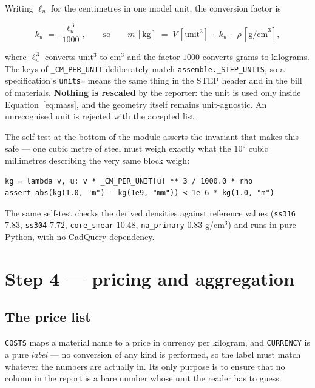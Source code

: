 \documentclass[9pt,a4paper]{extarticle}
\newcommand{\code}[1]{\texttt{\small #1}}
\begin{document}
Writing $\ell_u$ for the centimetres in one model unit, the conversion factor is

\begin{equation}
  k_u \;=\; \frac{\ell_u^{\,3}}{1000},
  \qquad\text{so}\qquad
  m\,[\text{kg}] \;=\; V\,[\text{unit}^3]\;\cdot\;k_u\;\cdot\;\rho\,[\text{g/cm}^3],
  \label{eq:mass}
\end{equation}

where $\ell_u^{\,3}$ converts unit$^3$ to cm$^3$ and the factor $1000$ converts
grams to kilograms. The keys of \code{\_CM\_PER\_UNIT} deliberately match
\code{assemble.\_STEP\_UNITS}, so a specification's \code{units=} means the same
thing in the STEP header and in the bill of materials. \textbf{Nothing is
rescaled} by the reporter: the unit is used only inside
Equation~\eqref{eq:mass}, and the geometry itself remains unit-agnostic. An
unrecognised unit is rejected with the accepted list.

The self-test at the bottom of the module asserts the invariant that makes this
safe --- one cubic metre of steel must weigh exactly what the $10^9$ cubic
millimetres describing the very same block weigh:

\begin{lstlisting}[style=py]
kg = lambda v, u: v * _CM_PER_UNIT[u] ** 3 / 1000.0 * rho
assert abs(kg(1.0, "m") - kg(1e9, "mm")) < 1e-6 * kg(1.0, "m")
\end{lstlisting}

The same self-test checks the derived densities against reference values
(\code{ss316} $7.83$, \code{ss304} $7.72$, \code{core\_smear} $10.48$,
\code{na\_primary} $0.83$ g/cm$^3$) and runs in pure Python, with no CadQuery
dependency.

\section{Step 4 --- pricing and aggregation}
\label{sec:pricing}

\subsection{The price list}

\code{COSTS} maps a material name to a price in currency per kilogram, and
\code{CURRENCY} is a pure \emph{label} --- no conversion of any kind is
performed, so the label must match whatever the numbers are actually in. Its
only purpose is to ensure that no column in the report is a bare number whose
unit the reader has to guess.
\end{document}

